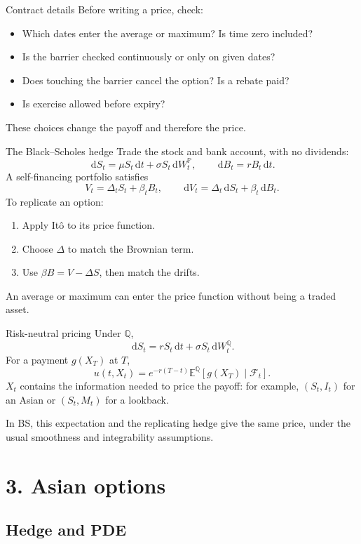 \documentclass[handout,10pt,t,aspectratio=169]{beamer}
\newcommand{\E}{\mathbb E}
\newcommand{\Q}{\mathbb Q}
\newcommand{\Pp}{\mathbb P}
\newcommand{\F}{\mathcal F}
\newcommand{\dd}{\,\mathrm d}
\begin{document}
\begin{frame}{Contract details}
\small
Before writing a price, check:
\begin{itemize}
\item Which dates enter the average or maximum? Is time zero included?
\item Is the barrier checked continuously or only on given dates?
\item Does touching the barrier cancel the option? Is a rebate paid?
\item Is exercise allowed before expiry?
\end{itemize}
These choices change the payoff and therefore the price.
\end{frame}

\begin{frame}{The Black--Scholes hedge}
\small
Trade the stock and bank account, with no dividends:
\[
 \dd S_t=\mu S_t\dd t+\sigma S_t\dd W_t^\Pp,\qquad
 \dd B_t=rB_t\dd t.
\]
A self-financing portfolio satisfies
\[
 V_t=\Delta_tS_t+\beta_tB_t,\qquad
 \dd V_t=\Delta_t\dd S_t+\beta_t\dd B_t.
\]
To replicate an option:
\begin{enumerate}
\item Apply It\^o to its price function.
\item Choose \(\Delta\) to match the Brownian term.
\item Use \(\beta B=V-\Delta S\), then match the drifts.
\end{enumerate}
An average or maximum can enter the price function without being a traded asset.
\end{frame}

\begin{frame}{Risk-neutral pricing}
\small
Under \(\Q\),
\[
 \dd S_t=rS_t\dd t+\sigma S_t\dd W_t^\Q.
\]
For a payment \(g(X_T)\) at \(T\),
\[
 \boxed{u(t,X_t)=e^{-r(T-t)}\E^\Q[g(X_T)\mid\F_t].}
\]
\(X_t\) contains the information needed to price the payoff: for example,
\((S_t,I_t)\) for an Asian or \((S_t,M_t)\) for a lookback.

\medskip
In BS, this expectation and the replicating hedge give the same price,
under the usual smoothness and integrability assumptions.
\end{frame}

\section{3. Asian options}
\subsection{Hedge and PDE}
\end{document}
